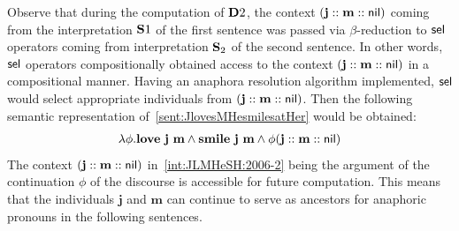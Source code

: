 
Observe that during the computation of $\D2$, the context $(\textbf{j} :: \textbf{m}::\nil)$ coming from the interpretation $\S1$ of the first sentence was passed via $\beta$-reduction to $\selK$ operators coming from interpretation $\S_2$ of the second sentence. In other words, $\selK$ operators compositionally obtained access to the context $(\textbf{j} :: \textbf{m}::\nil)$ in a compositional manner. Having an anaphora resolution algorithm implemented, $\selK$ would select appropriate individuals from $(\textbf{j} :: \textbf{m}::\nil)$. Then
the following semantic representation of~\eqref{sent:JlovesMHesmilesatHer} would be obtained: 
\begin{align}
\lambda \phi.\textbf{love} \  \textbf{j} \ \textbf{m} \land    \textbf{smile}  \ \textbf{j} \ \textbf{m} \land \phi   (\textbf{j} :: \textbf{m}::\nil) \label{int:JLMHeSH:2006-2}
\end{align}
The context $ (\textbf{j} :: \textbf{m}::\nil)$ in~\eqref{int:JLMHeSH:2006-2} being the argument of the continuation $\phi$ of the discourse is accessible for future computation. This means that the individuals $\textbf{j}$ and $\textbf{m}$ can continue to serve as ancestors for anaphoric pronouns in the following sentences. 
